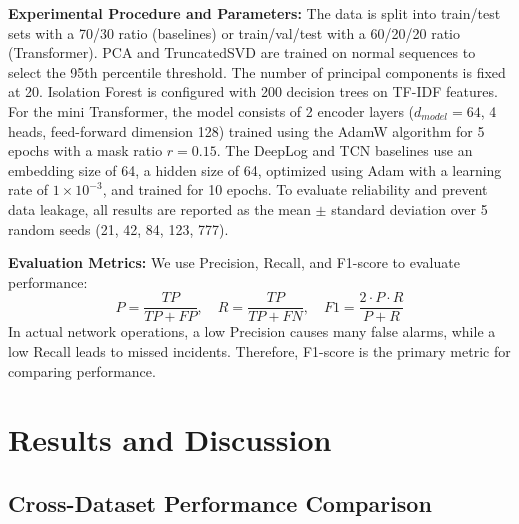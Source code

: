 \documentclass[conference]{IEEEtran}
\begin{document}
\textbf{Experimental Procedure and Parameters:} The data is split into train/test sets with a 70/30 ratio (baselines) or train/val/test with a 60/20/20 ratio (Transformer). PCA and TruncatedSVD are trained on normal sequences to select the 95th percentile threshold. The number of principal components is fixed at 20. Isolation Forest is configured with 200 decision trees on TF-IDF features. For the mini Transformer, the model consists of 2 encoder layers ($d_{model}{=}64$, 4 heads, feed-forward dimension 128) trained using the AdamW algorithm \cite{b17} for 5 epochs with a mask ratio $r{=}0.15$. The DeepLog and TCN baselines use an embedding size of 64, a hidden size of 64, optimized using Adam with a learning rate of $1\times 10^{-3}$, and trained for 10 epochs. To evaluate reliability and prevent data leakage, all results are reported as the mean $\pm$ standard deviation over 5 random seeds (21, 42, 84, 123, 777).

\textbf{Evaluation Metrics:} We use Precision, Recall, and F1-score to evaluate performance:
\begin{equation}
P = \frac{TP}{TP + FP}, \quad R = \frac{TP}{TP + FN}, \quad F1 = \frac{2 \cdot P \cdot R}{P + R}
\label{eq_metrics}
\end{equation}
In actual network operations, a low Precision causes many false alarms, while a low Recall leads to missed incidents. Therefore, F1-score is the primary metric for comparing performance.

\section{Results and Discussion}
\subsection{Cross-Dataset Performance Comparison}
\end{document}

